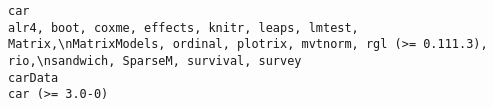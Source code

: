 \documentclass[
  letterpaper,
  DIV=11,
  numbers=noendperiod]{scrreprt}
\begin{document}
\begin{verbatim}
car                                                                                                                                                                                                                                                                                                                                                                                                                                                                                                                                                                                                                                                                                                                                                                                                                                                                                                                                                                                                                                                                                                                                           alr4, boot, coxme, effects, knitr, leaps, lmtest, Matrix,\nMatrixModels, ordinal, plotrix, mvtnorm, rgl (>= 0.111.3), rio,\nsandwich, SparseM, survival, survey
carData                                                                                                                                                                                                                                                                                                                                                                                                                                                                                                                                                                                                                                                                                                                                                                                                                                                                                                                                                                                                                                                                                                                                                                                                                                                                                        car (>= 3.0-0)

\end{verbatim}
\end{document}
